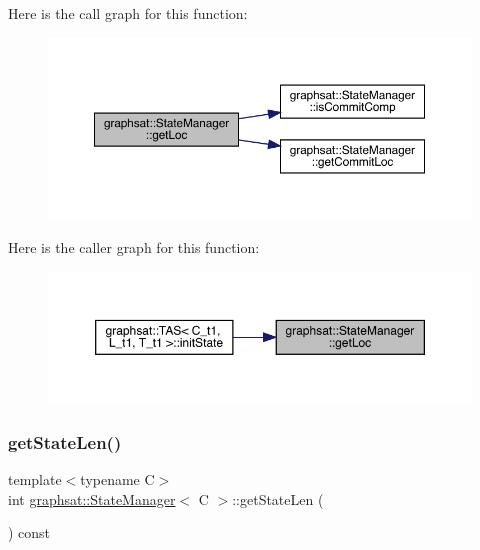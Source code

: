 Here is the call graph for this function\+:
\nopagebreak
\begin{figure}[H]
\begin{center}
\leavevmode
\includegraphics[width=350pt]{classgraphsat_1_1_state_manager_a519879992df5ba58f27ae21ddf766a8e_cgraph}
\end{center}
\end{figure}
Here is the caller graph for this function\+:
\nopagebreak
\begin{figure}[H]
\begin{center}
\leavevmode
\includegraphics[width=350pt]{classgraphsat_1_1_state_manager_a519879992df5ba58f27ae21ddf766a8e_icgraph}
\end{center}
\end{figure}
\mbox{\label{classgraphsat_1_1_state_manager_a80a6a997889366c04b9dd7094ad0b139}} 
\subsubsection{\texorpdfstring{getStateLen()}{getStateLen()}}
{\footnotesize\ttfamily template$<$typename C$>$ \\
int \mbox{\hyperlink{classgraphsat_1_1_state_manager}{graphsat\+::\+State\+Manager}}$<$ C $>$\+::get\+State\+Len (\begin{DoxyParamCaption}{ }\end{DoxyParamCaption}) const\hspace{0.3cm}{\ttfamily [inline]}}

